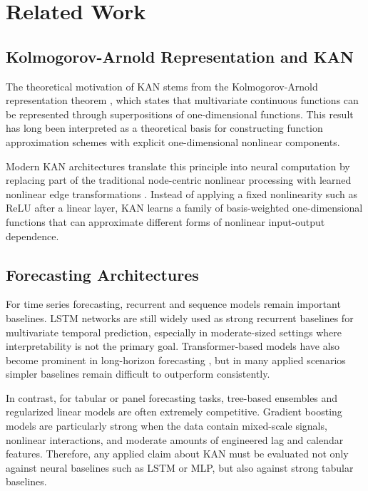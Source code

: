 \documentclass[10pt,conference,onecolumn]{IEEEtran}
\begin{document}
\section{Related Work}

\subsection{Kolmogorov-Arnold Representation and KAN}

The theoretical motivation of KAN stems from the Kolmogorov-Arnold representation theorem \cite{kolmogorov1957,arnold1963}, which states that multivariate continuous functions can be represented through superpositions of one-dimensional functions. This result has long been interpreted as a theoretical basis for constructing function approximation schemes with explicit one-dimensional nonlinear components.

Modern KAN architectures translate this principle into neural computation by replacing part of the traditional node-centric nonlinear processing with learned nonlinear edge transformations \cite{liu2024kan}. Instead of applying a fixed nonlinearity such as ReLU after a linear layer, KAN learns a family of basis-weighted one-dimensional functions that can approximate different forms of nonlinear input-output dependence.

\subsection{Forecasting Architectures}

For time series forecasting, recurrent and sequence models remain important baselines. LSTM networks are still widely used as strong recurrent baselines for multivariate temporal prediction, especially in moderate-sized settings where interpretability is not the primary goal. Transformer-based models have also become prominent in long-horizon forecasting \cite{zhou2021informer}, but in many applied scenarios simpler baselines remain difficult to outperform consistently.

In contrast, for tabular or panel forecasting tasks, tree-based ensembles and regularized linear models are often extremely competitive. Gradient boosting models are particularly strong when the data contain mixed-scale signals, nonlinear interactions, and moderate amounts of engineered lag and calendar features. Therefore, any applied claim about KAN must be evaluated not only against neural baselines such as LSTM or MLP, but also against strong tabular baselines.
\end{document}
